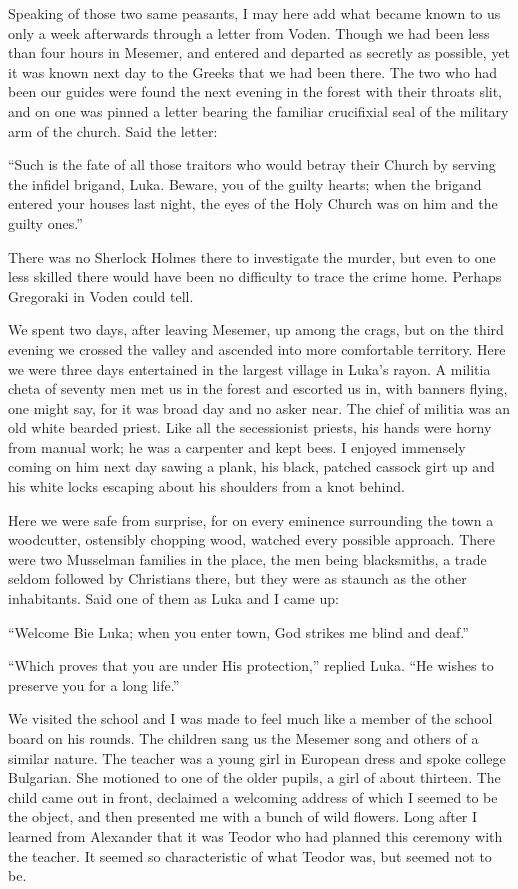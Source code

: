 \documentclass[a5paper,12pt]{book}
\begin{document}
Speaking of those two same peasants, I may here add what became known to us only a week afterwards through a letter from Voden. Though we had been less than four hours in Mesemer, and entered and departed as secretly as possible, yet it was known next day to the Greeks that we had been there. The two who had been our guides were found the next evening in the forest with their throats slit, and on one was pinned a letter bearing the familiar crucifixial seal of the military arm of the church. Said the letter: 

“Such is the fate of all those traitors who would betray their Church by serving the infidel brigand, Luka. Beware, you of the guilty hearts; when the brigand entered your houses last night, the eyes of the Holy Church was on him and the guilty ones.” 

There was no Sherlock Holmes there to investigate the murder, but even to one less skilled there would have been no difficulty to trace the crime home. Perhaps Gregoraki in Voden could tell. 

We spent two days, after leaving Mesemer, up among the crags, but on the third evening we crossed the valley and ascended into more comfortable territory. Here we were three days entertained in the largest village in Luka's rayon. A militia cheta of seventy men met us in the forest and escorted us in, with banners flying, one might say, for it was broad day and no asker near. The chief of militia was an old white bearded priest.
Like all the secessionist priests, his hands were horny from manual work; he was a carpenter and kept bees. I enjoyed immensely coming on him next day sawing a plank, his black, patched cassock girt up and his white locks escaping about his shoulders from a knot behind. 

Here we were safe from surprise, for on every eminence surrounding the town a woodcutter, ostensibly chopping wood, watched every possible approach. There were two Musselman families in the place, the men being blacksmiths, a trade seldom followed by Christians there, but they were as staunch as the other inhabitants. Said one of them as Luka and I came up: 

“Welcome Bie Luka; when you enter town, God strikes me blind and deaf.” 

“Which proves that you are under His protection,” replied Luka. “He wishes to preserve you for a long life.” 

We visited the school and I was made to feel much like a member of the school board on his rounds. The children sang us the Mesemer song and others of a similar nature. The teacher was a young girl in European dress and spoke college Bulgarian. She motioned to one of the older pupils, a girl of about thirteen. The child came out in front, declaimed a welcoming address of which I seemed to be the object, and then presented me with a bunch of wild flowers. Long after I learned from Alexander that it was Teodor who had planned this ceremony with the teacher. It seemed so characteristic of what Teodor was, but seemed not to be. 
\end{document}
